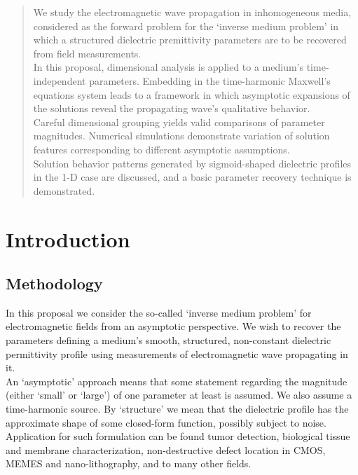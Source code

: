 \documentclass[12pt,twoside]{report}
\begin{document}
\begin{abstract}

We study the electromagnetic wave propagation in inhomogeneous media, considered as the forward problem for the `inverse medium problem' in which a structured dielectric premittivity parameters are to be recovered from field measurements. \\
In this proposal, dimensional analysis is applied to a medium's time-independent parameters. Embedding in the time-harmonic Maxwell's equations system leads to a framework in which asymptotic expansions of the solutions reveal the propagating wave's qualitative behavior.\\
Careful dimensional grouping yields valid comparisons of parameter magnitudes. Numerical simulations demonstrate variation of solution features corresponding to different asymptotic assumptions.\\
Solution behavior patterns generated by sigmoid-shaped dielectric profiles in the 1-D case are discussed, and a basic parameter recovery technique is demonstrated.


 

\end{abstract}

\newpage

\chapter{Introduction}
\section{Methodology  }
\label{sec:methodology}

In this proposal we consider the so-called `inverse medium problem' for electromagnetic fields from an asymptotic perspective. We wish to recover the parameters defining a medium's smooth, structured, non-constant dielectric permittivity profile using measurements of electromagnetic wave propagating in it.\\
An `asymptotic' approach means that some statement regarding the magnitude (either `small' or `large') of one parameter at least is assumed. We also assume a time-harmonic source. By `structure' we mean that the dielectric profile has the approximate shape of some closed-form function, possibly subject to noise. \\
Application for such formulation can be found tumor detection, biological tissue and membrane characterization, non-destructive defect location in CMOS, MEMES and nano-lithography, and to many other fields.\\
\end{document}
